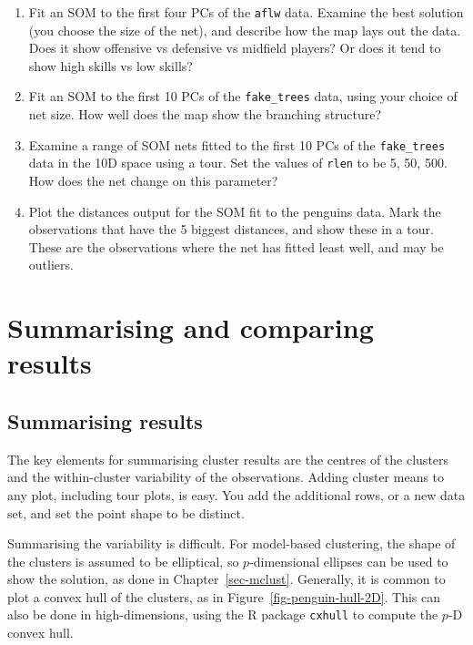 \documentclass[
  letterpaper,
]{book}
\providecommand{\tightlist}{%
  \setlength{\itemsep}{0pt}\setlength{\parskip}{0pt}}\usepackage{longtable,booktabs,array}
\begin{document}

\begin{enumerate}
\def\labelenumi{\arabic{enumi}.}
\tightlist
\item
  Fit an SOM to the first four PCs of the \texttt{aflw} data. Examine
  the best solution (you choose the size of the net), and describe how
  the map lays out the data. Does it show offensive vs defensive vs
  midfield players? Or does it tend to show high skills vs low skills?
\item
  Fit an SOM to the first 10 PCs of the \texttt{fake\_trees} data, using
  your choice of net size. How well does the map show the branching
  structure?
\item
  Examine a range of SOM nets fitted to the first 10 PCs of the
  \texttt{fake\_trees} data in the 10D space using a tour. Set the
  values of \texttt{rlen} to be 5, 50, 500. How does the net change on
  this parameter?
\item
  Plot the distances output for the SOM fit to the penguins data. Mark
  the observations that have the 5 biggest distances, and show these in
  a tour. These are the observations where the net has fitted least
  well, and may be outliers.
\end{enumerate}

\hypertarget{sec-clust-compare}{%
\chapter{Summarising and comparing results}\label{sec-clust-compare}}


\hypertarget{summarising-results}{%
\section{Summarising results}\label{summarising-results}}

The key elements for summarising cluster results are the centres of the
clusters and the within-cluster variability of the observations. Adding
cluster means to any plot, including tour plots, is easy. You add the
additional rows, or a new data set, and set the point shape to be
distinct.

Summarising the variability is difficult. For model-based clustering,
the shape of the clusters is assumed to be elliptical, so
\(p\)-dimensional ellipses can be used to show the solution, as done in
Chapter~\ref{sec-mclust}. Generally, it is common to plot a convex hull
of the clusters, as in Figure~\ref{fig-penguin-hull-2D}. This can also
be done in high-dimensions, using the R package \texttt{cxhull} to
compute the \(p\)-D convex hull.
\end{document}
